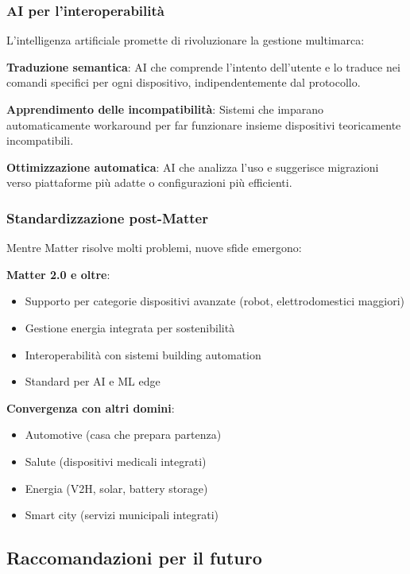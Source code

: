 \subsubsection{AI per l'interoperabilità}

L'intelligenza artificiale promette di rivoluzionare la gestione multimarca:

\textbf{Traduzione semantica}: AI che comprende l'intento dell'utente e lo traduce nei comandi specifici per ogni dispositivo, indipendentemente dal protocollo.

\textbf{Apprendimento delle incompatibilità}: Sistemi che imparano automaticamente workaround per far funzionare insieme dispositivi teoricamente incompatibili.

\textbf{Ottimizzazione automatica}: AI che analizza l'uso e suggerisce migrazioni verso piattaforme più adatte o configurazioni più efficienti.

\subsubsection{Standardizzazione post-Matter}

Mentre Matter risolve molti problemi, nuove sfide emergono:

\textbf{Matter 2.0 e oltre}:
\begin{itemize}
    \item Supporto per categorie dispositivi avanzate (robot, elettrodomestici maggiori)
    \item Gestione energia integrata per sostenibilità
    \item Interoperabilità con sistemi building automation
    \item Standard per AI e ML edge
\end{itemize}

\textbf{Convergenza con altri domini}:
\begin{itemize}
    \item Automotive (casa che prepara partenza)
    \item Salute (dispositivi medicali integrati)
    \item Energia (V2H, solar, battery storage)
    \item Smart city (servizi municipali integrati)
\end{itemize}

\subsection{Raccomandazioni per il futuro}

